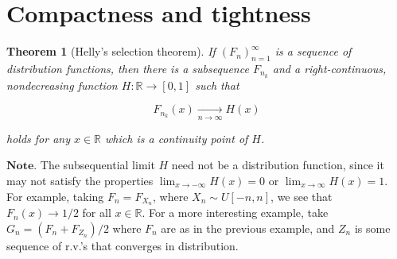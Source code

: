 \documentclass[11pt]{report}
\newcommand{\R}{\mathbb{R}}
\theoremstyle{plain}
\newtheorem{thm}{Theorem}[chapter]
\theoremstyle{definition}
\begin{document}
\section{Compactness and tightness}

\begin{thm}[Helly's selection theorem]
\label{thm-helly}
If $(F_n)_{n=1}^\infty$ is a sequence of distribution
functions, then there is a subsequence $F_{n_k}$ and
a right-continuous, nondecreasing function
$H:\R\to[0,1]$ such that

\[
F_{n_k}(x)\xrightarrow[n\to\infty]{} H(x)
\]

\noindent holds for any $x\in\R$ which is a continuity point of
$H$.
\end{thm}

\noindent $\textbf{Note.}$ The subsequential limit $H$ need not
be a distribution function, since it may not satisfy
the properties $\lim_{x\to-\infty} H(x) = 0$ or
$\lim_{x\to\infty} H(x)=1$. For example, taking
$F_n = F_{X_n}$, where $X_n \sim U[-n,n]$, we see
that $F_n(x)\to 1/2$ for all $x\in\R$. For a more
interesting example, take $G_n = (F_n + F_{Z_n})/2$
where $F_n$ are as in the previous example, and $Z_n$
is some sequence of r.v.'s that converges in
distribution.
\end{document}
